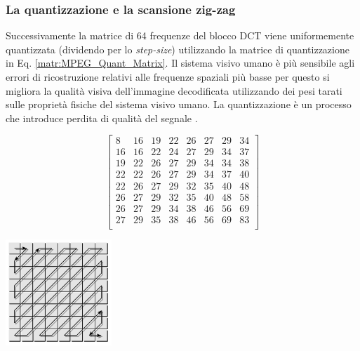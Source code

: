 


\subsubsection{La quantizzazione e la scansione zig-zag}
Successivamente la matrice di 64 frequenze del blocco DCT viene uniformemente quantizzata (dividendo per lo \textit{step-size}) utilizzando la matrice di quantizzazione in Eq. \ref{matr:MPEG_Quant_Matrix}. Il sistema visivo umano è più sensibile agli errori di ricostruzione relativi alle frequenze spaziali più basse per questo si migliora la qualità visiva dell'immagine decodificata utilizzando dei pesi tarati sulle proprietà fisiche del sistema visivo umano. La quantizzazione è un processo che introduce perdita di qualità del segnale \parencite{ProgettazioneEproduzioneMultimediale}.

\begin{minipage}{0.5\linewidth}
	\begin{equation} \label{matr:MPEG_Quant_Matrix}
		\begin{bmatrix} 
			8 & 16 & 19 & 22 & 26 & 27 & 29 & 34\\
			16 & 16 & 22 & 24 & 27 & 29 & 34 & 37\\
			19 & 22 & 26 & 27 & 29 & 34 & 34 & 38\\
			22 & 22 & 26 & 27 & 29 & 34 & 37 & 40\\
			22 & 26 & 27 & 29 & 32 & 35 & 40 & 48\\
			26 & 27 & 29 & 32 & 35 & 40 & 48 & 58\\
			26 & 27 & 29 & 34 & 38 & 46 & 56 & 69\\
			27 & 29 & 35 & 38 & 46 & 56 & 69 & 83\\
		\end{bmatrix}
	\end{equation}
	\vfill
\end{minipage}%
\begin{minipage}{0.5\linewidth}
	\centering
	\includegraphics[width=4cm]{immagini/JPEG_ZigZag}
	\label{fig:JPEG_ZigZag}
\end{minipage}%

